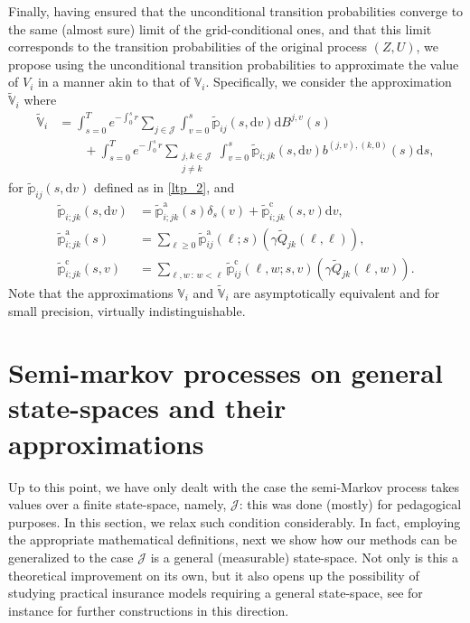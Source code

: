\documentclass[11pt,leqno]{amsart}
\numberwithin{table}{section}
\numberwithin{figure}{section}
\numberwithin{equation}{section}
\newcommand{\dd}{\mathrm{d}}
\newcommand{\1}{{\mathds{1}}}
\newcommand{\0}{\mat{0}}
\newcommand{\ap}[1]{\mathbb{#1}}
\newcommand{\tld}[1]{\widetilde{#1}}
\newcommand{\apt}[1]{\tld{\mathbb{#1}}}
\begin{document}
{Finally, having ensured that the unconditional transition probabilities converge to the same 
(almost sure) limit of the grid-conditional ones, and that this limit corresponds to the transition probabilities of the original process $(Z,U)$, we propose using the unconditional transition probabilities to approximate the value of $V_i$ in a manner akin to that of $\ap{V}_i$. Specifically, we consider the approximation $\apt{V}_i$ where
\begin{align*}
\apt{V}_{i}& = \int_{s=0}^T e^{-\int_0^s r} \sum_{j\in\mathcal{J}}\int_{v=0}^s \apt{p}_{ij}(s,\dd v) \dd B^{j,v}(s)\\
&\qquad + \int_{s=0}^T e^{-\int_0^s r} \sum_{\substack{j,k\in\mathcal{J}\\ j\neq k}}\int_{v=0}^s \apt{p}_{i;jk}(s,\dd v) b^{(j,v),(k,0)}(s)\dd s,
\end{align*}
for $\apt{p}_{ij}(s, \dd v)$ defined as in \eqref{ltp_2}, and
\begin{align*}
\apt{p}_{i;jk}(s, \dd v) & = \apt{p}_{i;jk}^{\mathrm{a}}(s)\delta_{s}(v) + \apt{p}_{i;jk}^{\mathrm{c}}(s, v)\dd v,\\
\apt{p}_{i;jk}^{\mathrm{a}}(s) & = \sum_{\ell\ge 0} \apt{p}_{ij}^{\mathrm{a}}(\ell; s)(\gamma \tld{Q}_{jk}(\ell,\ell)),\\
\apt{p}_{i;jk}^{\mathrm{c}}(s,v) &= \sum_{\ell, w\,:\, w< \ell} \apt{p}_{ij}^{\mathrm{c}}(\ell, w; s,v)(\gamma \tld{Q}_{jk}(\ell,w)).
\end{align*}
Note that the approximations $\ap{V}_i$ and $\apt{V}_i$ are asymptotically equivalent and for small precision, virtually indistinguishable.
{
\section{Semi-markov processes on general state-spaces and their approximations}
 Up to this point, we have only dealt with the case the semi-Markov process takes values over a finite state-space, namely, $\mathcal{J}$: this was done (mostly) for pedagogical purposes. In this section, we relax such condition considerably. In fact, employing the appropriate mathematical definitions, next we show how our methods can be generalized to the case $\mathcal{J}$ is a general (measurable) state-space. { Not only is this a theoretical improvement on its own, but it also opens up the possibility of studying practical insurance models requiring a general state-space, see for instance \cite{sokol2015generic} for further constructions in this direction.}

}}
\end{document}
